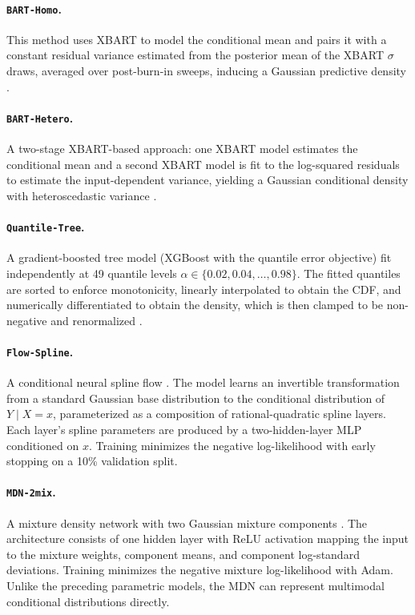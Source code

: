 \documentclass{article}
\newcommand{\method}[1]{\texttt{#1}}
\begin{document}
\paragraph{\method{BART-Homo}.}
This method uses XBART to model the conditional mean and pairs it with a
constant residual variance estimated from the posterior mean of the XBART
$\sigma$ draws, averaged over post-burn-in sweeps, inducing a Gaussian
predictive density \citep{chipman2010bart,he2019xbart}.

\paragraph{\method{BART-Hetero}.}
A two-stage XBART-based approach: one XBART model estimates the conditional
mean and a second XBART model is fit to the log-squared residuals to estimate
the input-dependent variance, yielding a Gaussian conditional density with
heteroscedastic variance \citep{chipman2010bart,he2019xbart}.

\paragraph{\method{Quantile-Tree}.}
A gradient-boosted tree model (XGBoost with the quantile error objective) fit
independently at 49 quantile levels
$\alpha\in\{0.02,0.04,\ldots,0.98\}$. The fitted quantiles are sorted to
enforce monotonicity, linearly interpolated to obtain the CDF, and
numerically differentiated to obtain the density, which is then clamped to be
non-negative and renormalized
\citep{koenker1978regression,meinshausen2006quantile,chen2016xgboost}.

\paragraph{\method{Flow-Spline}.}
A conditional neural spline flow \citep{durkan2019nsf,papamakarios2021normalizing}.
The model learns an invertible transformation from a standard Gaussian base
distribution to the conditional distribution of $Y\mid X=x$, parameterized as
a composition of rational-quadratic spline layers. Each layer's spline
parameters are produced by a two-hidden-layer MLP conditioned on $x$. Training
minimizes the negative log-likelihood with early stopping on a 10\% validation
split.

\paragraph{\method{MDN-2mix}.}
A mixture density network with two Gaussian mixture components
\citep{bishop1994mixture}. The architecture consists of one hidden layer with
ReLU activation mapping the input to the mixture weights, component means, and
component log-standard deviations. Training minimizes the negative mixture
log-likelihood with Adam. Unlike the preceding parametric models, the MDN can
represent multimodal conditional distributions directly.
\end{document}
